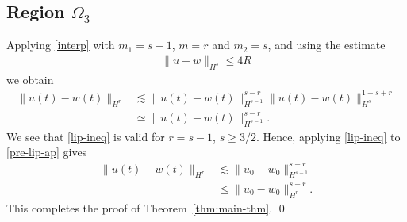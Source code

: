 \subsection{Region $\Omega_{3}$} 
\label{ssec:case-2}
%
%
Applying \eqref{interp} with $m_{1} = s-1$, $m =r$ and $m_{2} = s$, and 
using the estimate
%
%
\begin{equation*}
\begin{split}
\|u - w \|_{H^{s}} \le 4R
\end{split}
\end{equation*}
%
%
we obtain
%
%
\begin{equation}
\label{pre-lip-ap}
\begin{split}
\| u(t) - w(t) \|_{H^{r}} & \lesssim \| u(t) - w(t) \|_{H^{s-1}}^{s-r} \|u(t)
- w(t)\|_{H^{s}}^{1-s+r}
\\
& \simeq \| u(t) - w(t) \|_{H^{s-1}}^{s-r}.
\end{split}
\end{equation}
%
%
We see that \eqref{lip-ineq} is valid for  $r = s-1$, $s \ge 3/2$. Hence,
applying \eqref{lip-ineq} to \eqref{pre-lip-ap} gives
%
%
\begin{equation*}
\begin{split}
\| u(t) - w(t) \|_{H^{r}} & \lesssim  \|u_{0} - w_{0}\|_{H^{s-1}}^{s-r} 
\\
& \le
\|u_{0} - w_{0}\|_{H^{r}}^{s-r}.
\end{split}
\end{equation*}
%
This completes the proof of Theorem~\ref{thm:main-thm}. \qed
%
%
%
%
%
%
